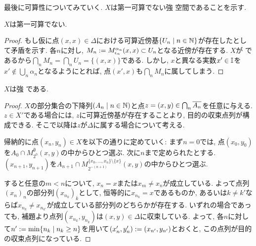 \documentclass[uplatex, dvipdfmx, a4paper, 12pt, class=jsbook, crop=false]{standalone}
\begin{document}
最後に可算性についてみていく. $ X $は第一可算でない強 \Frechet 空間であることを示す.
\begin{proposition}
	$ X $は第一可算でない.
\end{proposition}

\begin{proof}
	もし仮に点$ (x, x) \in \Delta $における可算近傍基$ \setcomp{U_n}{n \in \N} $が存在したとして矛盾を示す. 各$ n $に対し, $ M_n \mathrel{:=} M_{\epsilon_n}^{\alpha_n} (x, x) \subset U_n $となる近傍が存在する. $ X $が \Hausdorff であるから$ \bigcap_n M_n = \bigcap_n U_n = \{(x, x)\} $である. しかし, $ x $と異なる実数$ x' \in \mathbb{I} $を$ x' \not\in \bigcup_n \alpha_n $となるようにとれば, 点$ (x', x) $も$ \bigcap_n M_n $に属してしまう.
\end{proof}

\begin{proposition}
	$ X $は強 \Frechet である.
\end{proposition}

\begin{proof}
	$ X $の部分集合の下降列$ \setfamily{A_n}{n \in \N} $と点$ z = (x, y) \in \bigcap_n \overline{A_n} $を任意に与える. $ z \in X' $である場合には, $ z $に可算近傍基が存在することより, 目的の収束点列が構成できる. そこで以降は$ z $が$ \Delta $に属する場合について考える.

	帰納的に点$ (x_n, y_n) \in X $を以下の通りに定めていく: まず$ n = 0 $では, 点$ (x_0, y_0) $を$ A_0 \cap M_{2^0}^{\emptyset} (x, y) $の中からひとつ選ぶ. 次に$ n $まで定められたとする. $ (x_{n+1}, y_{n+1}) $を$ A_{n+1} \cap M_{2^{-(n+1)}}^{\{x_0, \ldots, x_n\}\setminus\{x\}} (x, y) $の中からひとつ選ぶ.

	すると任意の$ m < n $について, $ x_n = x $または$ x_m \neq x_n $が成立している. よって点列$ (x_n)_n $の部分列$ (x_{n_k})_k $として, 恒等的に$ x_{n_k} = x $であるものか, あるいは$ k \neq k' $ならば$ x_{n_k} \neq x_{n_{k'}} $が成立している部分列のどちらかが存在する. いずれの場合であっても, 補題より点列$ (x_{n_k}, y_{n_k}) $は$ (x, y) \in \Delta $に収束している. よって, 各$ n $に対して$ n' \defeq \min\setcomp{n_k}{n_k \geq n} $を用いて$ (x'_n, y'_n) \mathrel{:=} (x_{n'}, y_{n'}) $とおくと, この点列が目的の収束点列になっている.
\end{proof}
\end{document}
